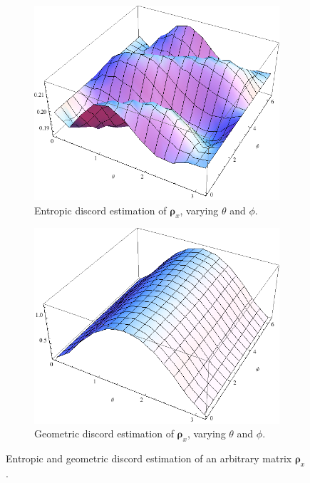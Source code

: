 \documentclass[%
 reprint,
 amsmath,amssymb,
 aps,
]{revtex4-1}
\begin{document}
\begin{figure}
        \centering
        \begin{subfigure}[b]{0.45\textwidth}
                \includegraphics[width=\textwidth]{d}
                \caption{Entropic discord estimation of $\boldsymbol{\rho}_x$, varying $\theta$ and $\phi$.}
                \label{fig:ent.ex.}
        \end{subfigure}%
        \vfill
        \begin{subfigure}[b]{0.45\textwidth}
                \includegraphics[width=\textwidth]{dg}
                \caption{Geometric discord estimation of $\boldsymbol{\rho}_x$, varying $\theta$ and $\phi$.}
                \label{fig:ent.ex.}
        \end{subfigure}%
        \caption{Entropic and geometric discord estimation of an arbitrary matrix $\boldsymbol{\rho}_x$.}\label{fig:ex.s}
\end{figure}
\end{document}
